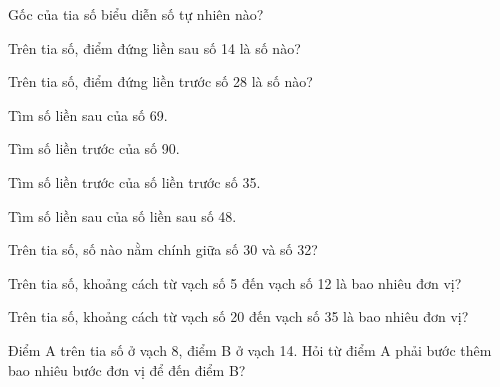 \begin{ex}
Gốc của tia số biểu diễn số tự nhiên nào?
\end{ex}

\begin{ex}
Trên tia số, điểm đứng liền sau số 14 là số nào?
\end{ex}

\begin{ex}
Trên tia số, điểm đứng liền trước số 28 là số nào?
\end{ex}

\begin{ex}
Tìm số liền sau của số 69.
\end{ex}

\begin{ex}
Tìm số liền trước của số 90.
\end{ex}

\begin{ex}
Tìm số liền trước của số liền trước số 35.
\end{ex}

\begin{ex}
Tìm số liền sau của số liền sau số 48.
\end{ex}

\begin{ex}
Trên tia số, số nào nằm chính giữa số 30 và số 32?
\end{ex}

\begin{ex}
Trên tia số, khoảng cách từ vạch số 5 đến vạch số 12 là bao nhiêu đơn vị?
\end{ex}

\begin{ex}
Trên tia số, khoảng cách từ vạch số 20 đến vạch số 35 là bao nhiêu đơn vị?
\end{ex}

\begin{ex}
Điểm A trên tia số ở vạch 8, điểm B ở vạch 14. Hỏi từ điểm A phải bước thêm bao nhiêu bước đơn vị để đến điểm B?
\end{ex}

